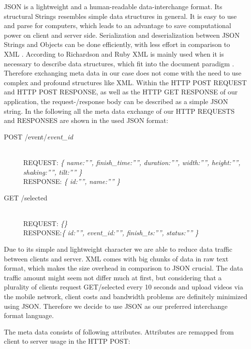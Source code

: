 \documentclass[conference]{IEEEtran}
\begin{document}
JSON is a lightweight and a human-readable data-interchange format. Its structural Strings resembles simple data structures in general. 
It is easy to use and parse for computers, which leads to an advantage to save computational power on client and server side. 
Serialization and deserialization between JSON Strings and Objects can be done efficiently, with less effort in comparison to XML \cite{Nurseitov:2009}.
According to Richardson and Ruby XML is mainly used when it is necessary to describe data structures, which fit into the document paradigm \cite{Richardson:2007}. 
Therefore exchanging meta data in our case does not come with the need to use complex and profound structures like XML. 
Within the HTTP POST REQUEST and HTTP POST RESPONSE, as well as the HTTP GET RESPONSE  of our application, 
the request-/response body can be described as a simple JSON string. In the following all the meta data exchange of our HTTP REQUESTS and 
RESPONSES are shown in the used JSON format:

\begin{description}
	\item[POST /event/\textit{event\_id}]\hfill\\	
				REQUEST: \textit{\{ name:””, finish\_time:””, duration:””, width:””, height:””, shaking:””, tilt:”” \}}\hfill \\
				RESPONSE: \textit{\{ id:””, name:”” \}}

	\item[GET /selected]\hfill\\		
				REQUEST: \textit{\{\}}\hfill \\
				RESPONSE:\textit{\{ id:””, event\_id:””, finish\_ts:””, status:”” \}}

\end{description}

Due to its simple and lightweight character we are able to reduce data traffic between clients and server. 
XML comes with big chunks of data in raw text format, which makes the size overhead in comparison to JSON crucial.
The data traffic amount might seem not differ much at first, but considering that a plurality of clients request GET/selected every 10 seconds and upload videos via the mobile network, client costs and bandwidth problems are definitely minimized using JSON. Therefore we decide to use JSON as our preferred interchange format language.

The meta data consists of following attributes. Attributes are remapped from client to server usage in the HTTP POST:
\end{document}
